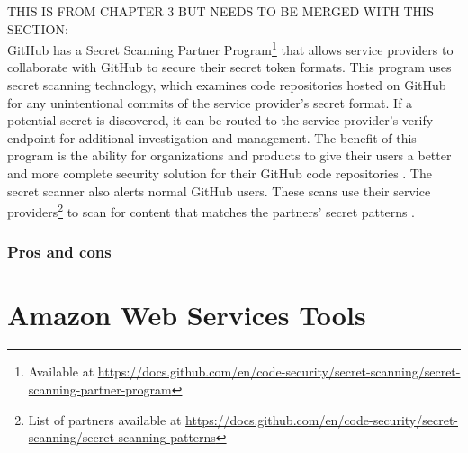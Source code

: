 \begin{itemize}
THIS IS FROM CHAPTER 3 BUT NEEDS TO BE MERGED WITH THIS SECTION:\\
GitHub has a Secret Scanning Partner Program\footnote{{Available at \url{https://docs.github.com/en/code-security/secret-scanning/secret-scanning-partner-program}}} that allows service providers to collaborate with GitHub to secure their secret token formats. This program uses secret scanning technology, which examines code repositories hosted on GitHub for any unintentional commits of the service provider's secret format. If a potential secret is discovered, it can be routed to the service provider's verify endpoint for additional investigation and management. The benefit of this program is the ability for organizations and products to give their users a better and more complete security solution for their GitHub code repositories \cite{partnerprogram}. The secret scanner also alerts normal GitHub users. These scans use their service providers\footnote{List of partners available at \url{https://docs.github.com/en/code-security/secret-scanning/secret-scanning-patterns}} to scan for content that matches the partners' secret patterns \cite{GitHubSecretScannerUserAlert}.
\end{itemize}
\subsubsection{Pros and cons}


\section{Amazon Web Services Tools}

